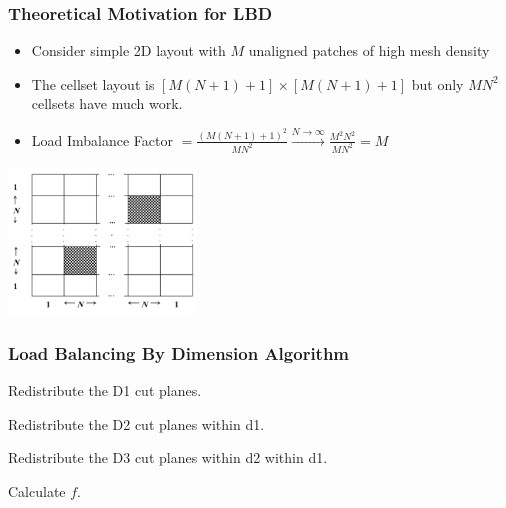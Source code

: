 \documentclass[xcolor={usenames,dvipsnames,svgnames,table}]{beamer}
\begin{document}
\begin{frame}[t]\frametitle{Theoretical Motivation for LBD}
  \begin{block}{}
  \begin{itemize}
    \item Consider simple 2D layout with $M$ unaligned patches of high mesh density
    \item The cellset layout is $[M(N+1)+1] \times [M(N+1)+1]$ but only $MN^2$ cellsets have much work.
    \item Load Imbalance Factor $= \frac{\left( M(N+1)+1 \right)^2}{MN^2} \xrightarrow{N\to \infty} \frac{M^2N^2}{MN^2} = M$
  \end{itemize}
  \end{block}
  \begin{center}
    \includegraphics[width=5cm ]{figures/2dgeneral.png}
  \end{center}
\end{frame}

\begin{frame}[t]\frametitle{Load Balancing By Dimension Algorithm}
\begin{algorithm}[H]
\label{lbd}
\begin{algorithmic}

    \STATE Redistribute the D1 cut planes.
  \ENDWHILE  
  
      \STATE Redistribute the D2 cut planes within d1. 
    \ENDWHILE
  \ENDFOR
  
        \STATE Redistribute the D3 cut planes within d2 within d1. 
      \ENDWHILE
    \ENDFOR
  \ENDFOR
  
  \STATE Calculate $f$.
\end{algorithmic}
\end{algorithm}
\end{frame}
\end{document}
